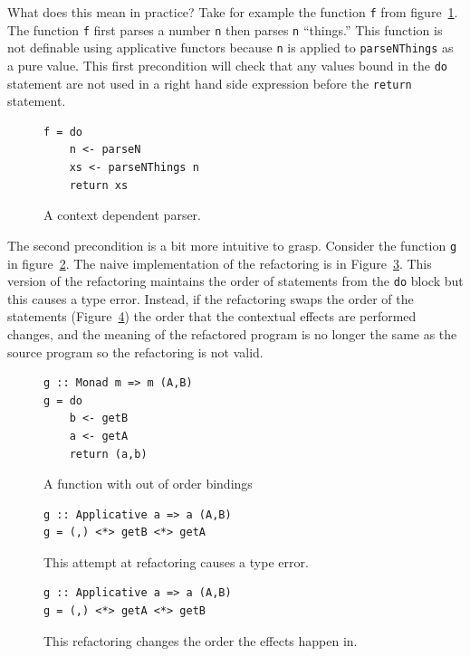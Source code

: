 What does this mean in practice? Take for example the function \texttt{f} from figure~\ref{parseNThings}. The function \texttt{f} first parses a number \texttt{n} then parses \texttt{n} ``things.'' This function is not definable using applicative functors because \texttt{n} is applied to \texttt{parseNThings} as a pure value. This first precondition will check that any values bound in the \texttt{do} statement are not used in a right hand side expression before the \texttt{return} statement.


\begin{figure}[t]
\begin{lstlisting}
f = do
	n <- parseN
	xs <- parseNThings n
	return xs
\end{lstlisting} 
\caption{A context dependent parser.}
\label{parseNThings}
\end{figure}

The second precondition is a bit more intuitive to grasp. Consider the function \texttt{g} in figure~\ref{outOrd}. The naive implementation of the refactoring is in Figure~\ref{outOrd_ref1}. This version of the refactoring maintains the order of statements from the \texttt{do} block but this causes a type error. Instead, if the refactoring swaps the order of the statements (Figure~\ref{outOrd_ref2}) the order that the contextual effects are performed changes, and the meaning of the refactored program is no longer the same as the source program so the refactoring is not valid. 

\begin{figure}[t]
\begin{lstlisting}
g :: Monad m => m (A,B)
g = do
	b <- getB
	a <- getA
	return (a,b)
\end{lstlisting}
\caption{A function with out of order bindings}
\label{outOrd}
\end{figure}

\begin{figure}[t]
\begin{lstlisting}
g :: Applicative a => a (A,B)
g = (,) <*> getB <*> getA
\end{lstlisting}
\caption{This attempt at refactoring causes a type error.}
\label{outOrd_ref1}
\end{figure}

\begin{figure}[t]
\begin{lstlisting}
g :: Applicative a => a (A,B)
g = (,) <*> getA <*> getB
\end{lstlisting} 
\caption{This refactoring changes the order the effects happen in.}
\label{outOrd_ref2}
\end{figure}

